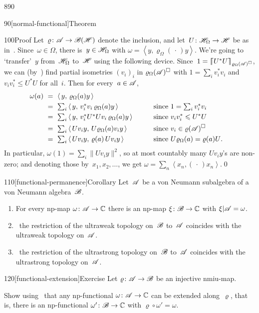 \begin{parsec}{890}
\begin{point}{90}[normal-functional]{Theorem}
\begin{point}{100}{Proof}
Let~$\varrho\colon \mathscr{A}\to\mathscr{B}(\mathscr{H})$
denote the inclusion,
and let~$U\colon \mathscr{H}_\Omega\to\mathscr{H}$
be as in~.
Since~$\omega\in\Omega$,
there is~$y\in\mathscr{H}_\Omega$
with $\omega = \left<y,\varrho_\Omega(\,\cdot\,)y\right>$.
We're going to `transfer'~$y$ from~$\mathscr{H}_\Omega$ to~$\mathscr{H}$
using the following device.
Since~$1=\left\lceil\!\!\left\lceil U^*U\right\rceil\!\!\right\rceil_{\varrho_\Omega(\mathscr{A})^\square}$,
we can 
(by~)
find partial isometries $(v_i)_i$ in
$\varrho_\Omega(\mathscr{A})^\square$
with $1=\sum_i v_i^*v_i$
and $v_iv_i^*\leq U^*U$
for all~$i$.
Then for every~$a\in\mathscr{A}$,
\begin{alignat*}{3}
	\textstyle
\omega(a)\  &=\
	\textstyle
	\left<\,y, \,\varrho_\Omega(a)y\,\right> 
	\\
&= 
	\textstyle
	\ \sum_i \left<\,y,\,  v_i^*v_i\, \varrho_\Omega(a) y \,\right>
	&&\qquad 
	\textstyle
	\text{since $1=\sum_i v_i^*v_i$}
	\\
&= 
	\textstyle
	\ \sum_i \left<\,y,\,  v_i^* U^*Uv_i \,\varrho_\Omega(a)y\, \right>
	&&\qquad\text{since $v_iv_i^*\leqslant U^*U$}
	\\
	&= 
	\textstyle
	\ \sum_i \left<\,Uv_i y,\, U \varrho_\Omega(a)v_i y\, \right>
	&&\qquad\text{since $v_i \in \varrho(\mathscr{A})^\square$}
	\\
	&= 
	\textstyle
	\ \sum_i \left<\,Uv_i y,\, \varrho(a) \, Uv_i y\, \right>
	&&\qquad\text{since $U\varrho_\Omega(a)=\varrho(a) U$}.
\end{alignat*}
In particular, $\omega(1)=\sum_i \|Uv_i y\|^2$,
so at most countably many $Uv_iy$'s are non-zero;
and denoting those by~$x_1,x_2,\dotsc$,
we get $\omega = \sum_n \left<x_n,(\,\cdot\,)x_n\right>$.\qed
\end{point}
\end{point}
\begin{point}{110}[functional-permanence]{Corollary}%
Let~$\mathscr{A}$ be a von Neumann subalgebra
of a von Neumann algebra~$\mathscr{B}$.
\begin{enumerate}
\item
For every np-map $\omega\colon \mathscr{A}\to\mathbb{C}$
there is an np-map $\xi\colon \mathscr{B}\to\mathbb{C}$
with $\xi|\mathscr{A}=\omega$.
\item%
\ 
the restriction of the ultraweak topology on~$\mathscr{B}$
to~$\mathscr{A}$ coincides with the ultraweak topology on~$\mathscr{A}$.
\item
\Define{Ultrastrong permanence:}\ 
the restriction of the ultrastrong topology on~$\mathscr{B}$
to~$\mathscr{A}$ coincides with the ultrastrong topology on~$\mathscr{A}$.
\end{enumerate}%
\spacingfix%
\end{point}%
\begin{point}{120}[functional-extension]{Exercise}%
Let $\varrho\colon \mathscr{A}\to\mathscr{B}$
be an injective nmiu-map.

Show 
using~
that any np-functional
$\omega\colon \mathscr{A}\to\mathbb{C}$
can be extended along~$\varrho$,
that is,
there is an np-functional
$\omega'\colon \mathscr{B}\to\mathbb{C}$
with $\varrho\circ \omega' = \omega$.
\end{point}
\end{parsec}
